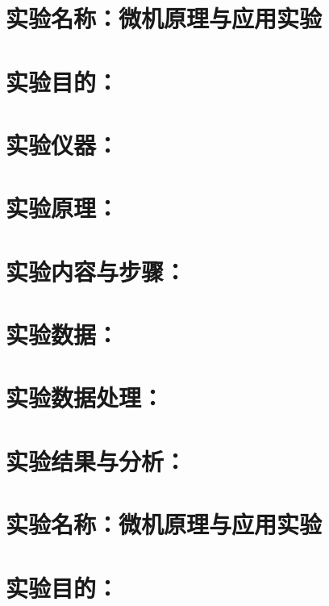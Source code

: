 \documentclass{USTBReport}
\begin{document}
\makecover
\maketitle

\section{实验名称：微机原理与应用实验}

\section{实验目的：}

\section{实验仪器：}

\section{实验原理：}

\section{实验内容与步骤：}

\section{实验数据：}

\section{实验数据处理：}

\section{实验结果与分析：}

\vspace*{1cm}

\maketitle

\section{实验名称：微机原理与应用实验}

\section{实验目的：}
\end{document}
